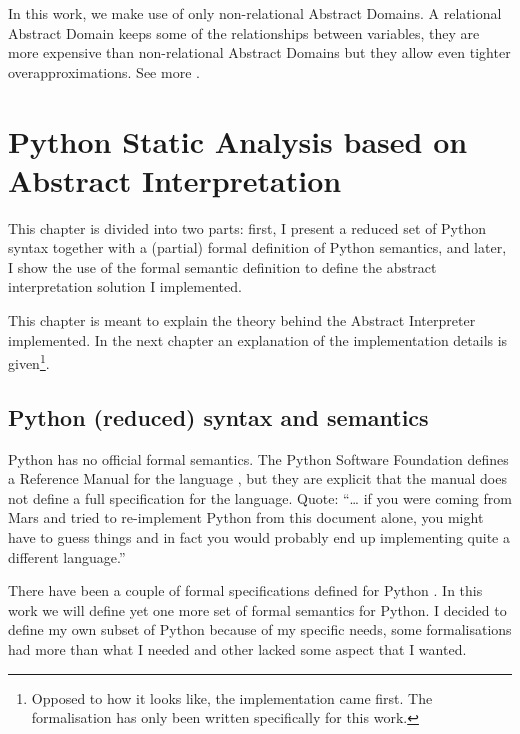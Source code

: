 \documentclass[
11pt, %
english, %
singlespacing, %
headsepline, %
]{MastersDoctoralThesis} %
\begin{document}
In this work, we make use of only non-relational Abstract Domains. A
relational Abstract Domain keeps some of the relationships between
variables, they are more expensive than non-relational Abstract Domains
but they allow even tighter overapproximations. See more
\textcite{mine_weakly_2004}.

\hypertarget{python-static-analysis-based-on-abstract-interpretation}{%
\chapter{Python Static Analysis based on Abstract
Interpretation}\label{python-static-analysis-based-on-abstract-interpretation}}

This chapter is divided into two parts: first, I present a reduced set
of Python syntax together with a (partial) formal definition of Python
semantics, and later, I show the use of the formal semantic definition
to define the abstract interpretation solution I implemented.

This chapter is meant to explain the theory behind the Abstract
Interpreter implemented. In the next chapter an explanation of the
implementation details is given\footnote{Opposed to how it looks like,
  the implementation came first. The formalisation has only been written
  specifically for this work.}.

\hypertarget{python-reduced-syntax-and-semantics}{%
\section{Python (reduced) syntax and
semantics}\label{python-reduced-syntax-and-semantics}}

Python has no official formal semantics. The Python Software Foundation
defines a Reference Manual for the language
\autocite{python_software_foundation_python_2019}, but they are explicit
that the manual does not define a full specification for the language.
Quote: \enquote{\ldots{} if you were coming from Mars and tried to
re-implement Python from this document alone, you might have to guess
things and in fact you would probably end up implementing quite a
different language.}

There have been a couple of formal specifications defined for Python
\autocites{politz_python_2013}{fromherz_static_2018}{guth_formal_2013}{ranson_semantics_2008}.
In this work we will define yet one more set of formal semantics for
Python. I{} decided to define my own subset of Python
because of my specific needs, some formalisations had more than what I
needed and other lacked some aspect that I wanted.
\end{document}
